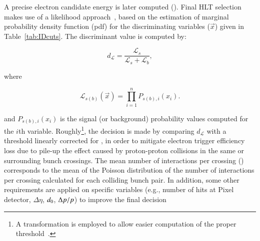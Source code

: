   


A precise electron candidate energy is later computed (\hltcalo). Final HLT selection makes use of a likelihood
approach~\cite{ATL-COM-PHYS-2017-1012,ATLAS-PERF-2017-01-002}, based on the estimation of marginal probability density function (pdf) for the discriminating variables ($\vec{x}$) given in Table~\ref{tab:IDcuts}. The discriminant value is computed by:




\begin{equation}
  d_{\mathcal{L}} = \frac{\mathcal{L}_{s}}{\mathcal{L}_{s} + \mathcal{L}_{b}},
\end{equation}
  
\noindent where
  
\begin{equation}
\mathcal{L}_{s(b)}(\vec{x}) = \prod_{i=1}^{n} P_{s(b),i}(x_i).
\label{eq:likelihoods}
\end{equation}



\noindent and $P_{s(b),i}(x_i)$ is the signal (or background) probability values computed for the $i$th variable. Roughly\footnote{A transformation is employed to allow
easier computation of the proper threshold~\cite{aaboud2019electron}.},
the decision is made by comparing $d_{\mathcal{L}}$ with a
threshold linearly corrected for \avgmu{}, in order to mitigate electron trigger
efficiency loss due to pile-up the effect caused by proton-proton collisions in the same or surrounding bunch crossings. The mean number of interactions per crossing (\avgmu{}) corresponds to the
mean of the Poisson distribution of the number of interactions per crossing calculated for each colliding bunch pair. In addition, some other requirements are
applied on specific variables (e.g., number of hits at Pixel detector, $\Delta\eta$, $d_0$, $\Delta p/p$) to improve the final decision~\cite{aaboud2019electron}

